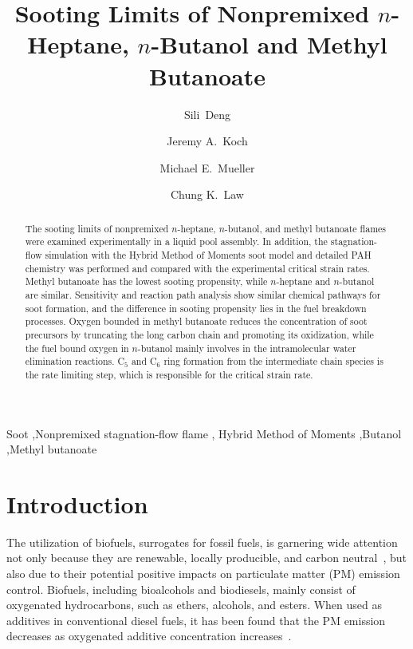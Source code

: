 \documentclass[preprint,3p,times,twocolumn]{elsarticleUS}
\begin{document}
\begin{frontmatter}

\title{Sooting Limits of Nonpremixed $n$-Heptane, $n$-Butanol and Methyl Butanoate}

\author{Sili~Deng}
\author{Jeremy A.~Koch}
\author{Michael E.~Mueller}
\author{Chung K.~Law}

\address{Department of Mechanical and Aerospace Engineering, Princeton University, Princeton, NJ 08544, USA}


\begin{abstract}
  The sooting limits of nonpremixed $n$-heptane, $n$-butanol, and methyl butanoate flames were examined experimentally in a liquid pool assembly. In addition, the stagnation-flow simulation with the Hybrid Method of Moments soot model and detailed PAH chemistry was performed and compared with the experimental critical strain rates. Methyl butanoate has the lowest sooting propensity, while $n$-heptane and $n$-butanol are similar. Sensitivity and reaction path analysis show similar chemical pathways for soot formation, and the difference in sooting propensity lies in the fuel breakdown processes. Oxygen bounded in methyl butanoate reduces the concentration of soot precursors by truncating the long carbon chain and promoting its oxidization, while the fuel bound oxygen in $n$-butanol mainly involves in the intramolecular water elimination reactions. C$_5$ and C$_6$ ring formation from the intermediate chain species is the rate limiting step, which is responsible for the critical strain rate.
\end{abstract}

\begin{keyword} 
Soot \sep Nonpremixed stagnation-flow flame \sep
Hybrid Method of Moments \sep Butanol \sep Methyl butanoate
\end{keyword}

\end{frontmatter}


\section{Introduction}

The utilization of biofuels, surrogates for fossil fuels, is garnering wide attention not only because they are renewable, locally producible, and carbon neutral~\cite{liu11}, but also due to their potential positive impacts on particulate matter (PM) emission control. Biofuels, including bioalcohols and biodiesels, mainly consist of oxygenated hydrocarbons, such as ethers, alcohols, and esters. When used as additives in conventional diesel fuels, it has been found that the PM emission decreases as oxygenated additive concentration increases~\cite{graboski98}. 
\end{document}

